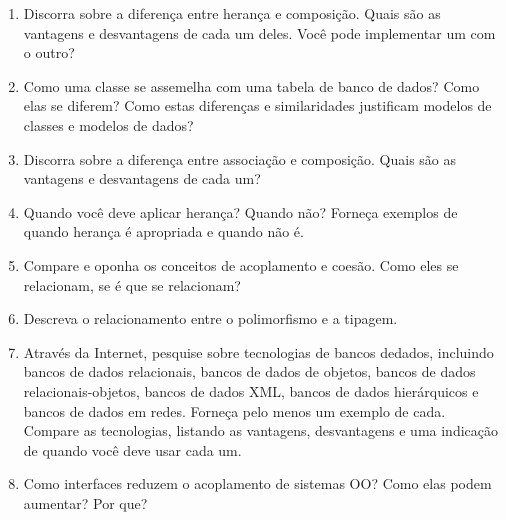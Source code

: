 \begin{enumerate}
\item Discorra sobre a diferença entre herança e composição. Quais são as vantagens e desvantagens de cada um deles. Você pode implementar um com o outro?

\item Como uma classe se assemelha com uma tabela de banco de dados? Como elas se diferem? Como estas diferenças e similaridades justificam modelos de classes e modelos de dados?

\item Discorra sobre a diferença entre associação e composição. Quais são as vantagens e desvantagens de cada um?

\item Quando você deve aplicar herança? Quando não? Forneça exemplos de quando herança é apropriada e quando não é.

\item Compare e oponha os conceitos de acoplamento e coesão. Como eles se relacionam, se é que se relacionam?

\item Descreva o relacionamento entre o polimorfismo e a tipagem.

\item Através da Internet, pesquise sobre tecnologias de bancos dedados, incluindo bancos de dados relacionais, bancos de dados de objetos, bancos de dados relacionais-objetos, bancos de dados XML, bancos de dados hierárquicos e bancos de dados em redes. Forneça pelo menos um exemplo de cada. Compare as tecnologias, listando as vantagens, desvantagens e uma indicação de quando você deve usar cada um.

\item Como interfaces reduzem o acoplamento de sistemas OO? Como elas podem aumentar? Por que?
\end{enumerate}
